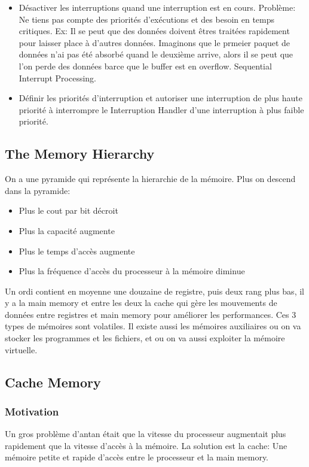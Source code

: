 \begin{itemize}
  \item Désactiver les interruptions quand une interruption est en cours.
    Problème: Ne tiens pas compte des priorités d'exécutions et des besoin en temps critiques.
    Ex: Il se peut que des données doivent êtres traitées rapidement pour laisser place à d'autres données.
    Imaginons que le prmeier paquet de données n'ai pas été absorbé quand le deuxième arrive,
    alors il se peut que l'on perde des données barce que le buffer est en overflow.
    Sequential Interrupt Processing.
  \item Définir les priorités d'interruption et autoriser une interruption de plus haute priorité
    à interrompre le Interruption Handler d'une interruption à plus faible priorité.
\end{itemize}

\subsection{The Memory Hierarchy}
On a une pyramide qui représente la hierarchie de la mémoire.
Plus on descend dans la pyramide:
\begin{itemize}
  \item Plus le cout par bit décroit
  \item Plus la capacité augmente
  \item Plus le temps d'accès augmente
  \item Plus la fréquence d'accès du processeur à la mémoire diminue
\end{itemize}
Un ordi contient en moyenne une douzaine de registre, puis deux rang plus bas,
il y a la main memory et entre les deux la cache qui gère les mouvements de données entre registres
et main memory pour améliorer les performances.
Ces 3 types de mémoires sont volatiles.
Il existe aussi les mémoires auxiliaires ou on va stocker les programmes et les fichiers,
et ou on va aussi exploiter la mémoire virtuelle.

\subsection{Cache Memory}
\subsubsection{Motivation}
Un gros problème d'antan était que la vitesse du processeur augmentait plus rapidement que la vitesse d'accès à la mémoire.
La solution est la cache: Une mémoire petite et rapide d'accès entre le processeur et la main memory.

